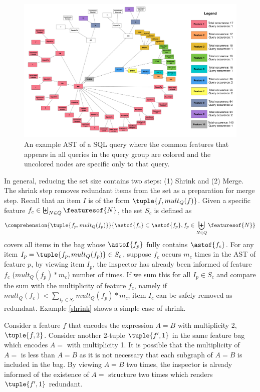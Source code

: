 \begin{figure}[h!]
\centering
\includegraphics[height=11.5 cm]{graphics/exampleFPTreeColored}
\caption{An example AST of a SQL query where the common features that appears in all queries in the query group are colored and the uncolored nodes are specific only to that query.
}
\label{fig:summary_ast}
\end{figure}

In general, reducing the set size contains two steps: (1) Shrink and (2) Merge.  The shrink step removes redundant items from the set as a preparation for merge step. Recall that an item $I$ is of the form $\tuple{f,mult_Q(f)}$. Given a specific feature $f_c \in \biguplus_{N \in Q}\featuresof{N}$, the set $S_c$ is defined as $$\comprehension{\tuple{f_p, mult_Q(f_p)}}{\astof{f_c} \subset \astof{f_p}, f_p \in \biguplus_{N \in Q}\featuresof{N}}$$ covers all items in the bag whose $\astof{f_p}$ fully contains $\astof{f_c}$. For any item $I_p=\tuple{f_p, mult_Q(f_p)} \in S_c$, suppose $f_c$ occurs $m_c$ times in the AST of feature $p$, by viewing item $I_p$, the inspector has already been informed of feature $f_c$ ($mult_Q(f_p)*m_c$) number of times. If we sum this for all $I_p \in S_c$ and compare the sum with the multiplicity of feature $f_c$, namely if $mult_Q(f_c) < \sum_{I_p\in S_c} mult_Q(f_p)*m_c$, item $I_c$ can be safely removed as redundant. Example \ref{shrink} shows a simple case of shrink.
\begin{example}
\label{shrink}
Consider a feature $f$ that encodes the expression $A=B$ with multiplicity 2, $\tuple{f,2}$. Consider another 2-tuple $\tuple{f',1}$ in the same feature bag which encodes $A=$ with multiplicity 1. It is possible that the multiplicity of $A=$ is less than $A=B$ as it is not necessary that each subgraph of $A=B$ is included in the bag. By viewing $A=B$ two times, the inspector is already informed of the existence of $A=$ structure two times which renders $\tuple{f',1}$ redundant.
\end{example}

